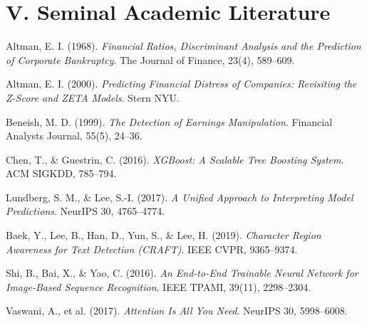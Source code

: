 \documentclass[11pt,a4paper,oneside]{report}
\begin{document}
\section*{V. Seminal Academic Literature}
\begin{enumerate}[label={[\arabic*]},resume]
    \item Altman, E. I. (1968). \textit{Financial Ratios, Discriminant Analysis and the Prediction of Corporate Bankruptcy}. The Journal of Finance, 23(4), 589--609.
    \item Altman, E. I. (2000). \textit{Predicting Financial Distress of Companies: Revisiting the Z-Score and ZETA Models}. Stern NYU.
    \item Beneish, M. D. (1999). \textit{The Detection of Earnings Manipulation}. Financial Analysts Journal, 55(5), 24--36.
    \item Chen, T., \& Guestrin, C. (2016). \textit{XGBoost: A Scalable Tree Boosting System}. ACM SIGKDD, 785--794.
    \item Lundberg, S. M., \& Lee, S.-I. (2017). \textit{A Unified Approach to Interpreting Model Predictions}. NeurIPS 30, 4765--4774.
    \item Baek, Y., Lee, B., Han, D., Yun, S., \& Lee, H. (2019). \textit{Character Region Awareness for Text Detection (CRAFT)}. IEEE CVPR, 9365--9374.
    \item Shi, B., Bai, X., \& Yao, C. (2016). \textit{An End-to-End Trainable Neural Network for Image-Based Sequence Recognition}. IEEE TPAMI, 39(11), 2298--2304.
    \item Vaswani, A., et al. (2017). \textit{Attention Is All You Need}. NeurIPS 30, 5998--6008.
\end{enumerate}
\end{document}
